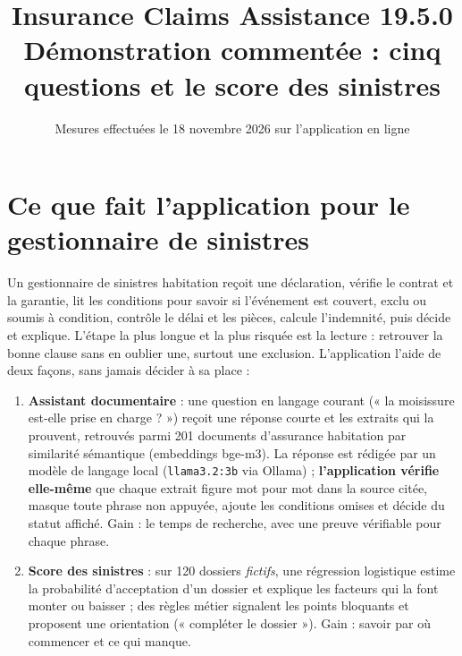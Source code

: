 \documentclass[11pt,a4paper]{article}
\title{\textbf{Insurance Claims Assistance 19.5.0}\\[4pt]\large Démonstration commentée : cinq questions et le score des sinistres}
\date{Mesures effectuées le 18 novembre 2026 sur l'application en ligne}
\begin{document}
\sloppy
\maketitle

\section*{Ce que fait l'application pour le gestionnaire de sinistres}
Un gestionnaire de sinistres habitation reçoit une déclaration, vérifie le contrat et la garantie,
lit les conditions pour savoir si l'événement est couvert, exclu ou soumis à condition, contrôle le
délai et les pièces, calcule l'indemnité, puis décide et explique. L'étape la plus longue et la
plus risquée est la lecture : retrouver la bonne clause sans en oublier une, surtout une exclusion.
L'application l'aide de deux façons, sans jamais décider à sa place :
\begin{enumerate}
\item \textbf{Assistant documentaire} : une question en langage courant (« la moisissure est-elle
prise en charge ? ») reçoit une réponse courte et les extraits qui la prouvent, retrouvés parmi 201
documents d'assurance habitation par similarité sémantique (embeddings bge-m3). La réponse est
rédigée par un modèle de langage local (\texttt{llama3.2:3b} via Ollama) ; \textbf{l'application
vérifie elle-même} que chaque extrait figure mot pour mot dans la source citée, masque toute
phrase non appuyée, ajoute les conditions omises et décide du statut affiché. Gain : le temps de
recherche, avec une preuve vérifiable pour chaque phrase.
\item \textbf{Score des sinistres} : sur 120 dossiers \emph{fictifs}, une régression logistique
estime la probabilité d'acceptation d'un dossier et explique les facteurs qui la font monter ou
baisser ; des règles métier signalent les points bloquants et proposent une orientation
(« compléter le dossier »). Gain : savoir par où commencer et ce qui manque.
\end{enumerate}
\end{document}
